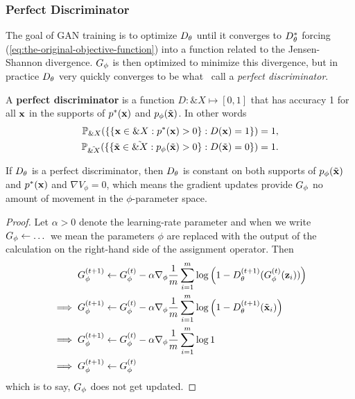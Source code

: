 
\subsubsection*{Perfect Discriminator}

The goal of GAN training is to optimize $D_\theta$ until it converges to
$D_\theta^*$ forcing (\ref{eq:the-original-objective-function}) into a
function related to the Jensen-Shannon divergence.  $G_\phi$ is then
optimized to minimize this divergence, but in practice $D_\theta$ very
quickly converges to be what~\cite{ref:arjovsky-towards-2017} call a
\textit{perfect discriminator}.

\begin{definition}%
  \label{def:perfect-discriminator}
  A \textbf{perfect discriminator} is a function $D:
  \&X \mapsto [0,1]$ that has accuracy 1 for all $\mathbf{x}$ in the supports
  of $p^*(\mathbf{x})$ and $p_{\phi}(\tilde{\mathbf{x}})$. In other words
  \begin{align}
    \mathbb{P}_{\&X}(\{\{\mathbf{x} \in \&X : p^*(\mathbf{x}) > 0\} : D(\mathbf{x}) = 1 \} )= 1, \\
    \mathbb{P}_{\tilde{\&X}}(\{\{\tilde{\mathbf{x}} \in \tilde{\&X} : p_{\phi}(\tilde{\mathbf{x}}) > 0\} : D(\tilde{\mathbf{x}}) = 0 \} )= 1.
  \end{align}
\end{definition}

\begin{theorem}%
  \label{thm:perfect-discriminator}
  If $D_\theta$ is a perfect discriminator, then $D_\theta$ is constant on both
  supports of $p_{\phi}(\tilde{\mathbf{x}})$ and $p^*(\mathbf{x})$ and $\nabla{V_\phi} = 0$, which means
  the gradient updates provide $G_\phi$ no amount of movement in the
  $\phi$-parameter space.
\end{theorem}

\begin{proof}%
  \label{prf:perfect-discriminator}
  Let $\alpha > 0$ denote the learning-rate parameter and when we
  write $G_\phi \gets \dots$ we mean the parameters $\phi$ are replaced
  with the output of the calculation on the right-hand side of the
  assignment operator. Then
  \begin{align}
    \label{eq:g-updates-no-good}
    G_\phi^{(t+1)} & \gets G_\phi^{(t)} - \alpha\nabla_\phi {1 \over m} \sum_{i=1}^m \log\left( 1 - D_\theta^{(t+1)}(G_\phi^{(t)}(\mathbf{z}_i)) \right) \\
    \implies G_\phi^{(t+1)} & \gets G_\phi^{(t)} - \alpha\nabla_\phi {1 \over m} \sum_{i=1}^m \log{ \left( 1 - D_\theta^{(t+1)}(\tilde{\mathbf{x}}_i) \right)} \\
    \implies G_\phi^{(t+1)} & \gets G_\phi^{(t)} - \alpha\nabla_\phi {1 \over m} \sum_{i=1}^m \log{1} \\
    \implies G_\phi^{(t+1)} & \gets G_\phi^{(t)}
  \end{align} which is to say, $G_\phi$ does not get updated.
\end{proof}

